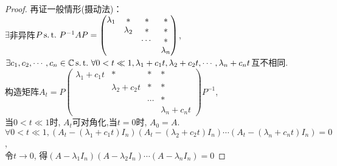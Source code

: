 \begin{proof}
  再证一般情形(摄动法)：\\
  $\exists$非异阵$P \operatorname{s.t.{}} P^{-1}AP=
  \begin{pmatrix}
    \lambda_1 & * & * & *\\
              & \lambda_2 & * & *\\
              && \cdots &*\\
    &&&\lambda_n
  \end{pmatrix}$,\\ 
  $\exists c_1,c_2,\cdots,c_n \in \mathbb{C} \operatorname{s.t.{}} \forall 0 < t \ll 1,
  \lambda_1+c_1t,\lambda_2+c_2t,\cdots,\lambda_n+c_nt$互不相同.\\
  构造矩阵$A_t=P\begin{pmatrix}
    \lambda_1+c_1t & * & * & *\\
              & \lambda_2+c_2t & * & *\\
              && \cdots &*\\
    &&&\lambda_n+c_nt
  \end{pmatrix}P^{-1}$,\\
  当$0 < t \ll 1$时, $A_t$可对角化,当$t=0$时, $A_0=A$.\\
  $\forall 0 < t \ll 1,
  (A_t-(\lambda_1+c_1t)I_n)(A_t-(\lambda_2+c_2t)I_n)\cdots(A_t-(\lambda_n+c_nt)I_n)=0$,\\
  令$t \longrightarrow 0$, 得$(A-\lambda_1I_n)(A-\lambda_2I_n)\cdots(A-\lambda_nI_n)=0$
\end{proof}

